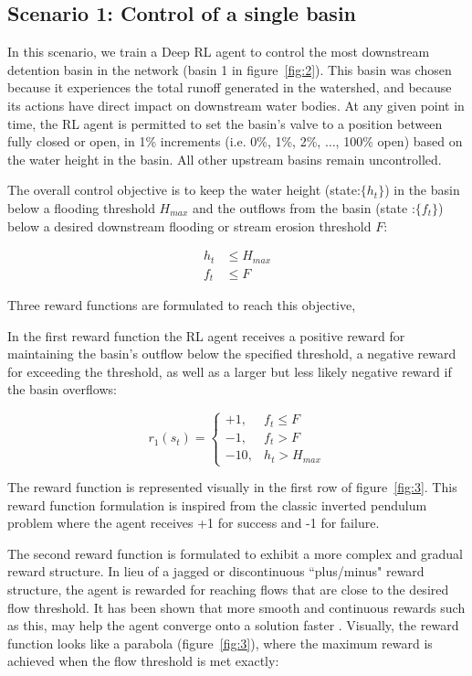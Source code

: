 \subsection{\textbf{Scenario 1: Control of a single basin}}
In this scenario, we train a Deep RL agent to control the most downstream detention basin in the network (basin 1 in figure~\ref{fig:2}).
This basin was chosen because it experiences the total runoff generated in the watershed, and because its actions have direct impact on downstream water bodies.
At any given point in time, the RL agent is permitted to set the basin’s valve to a position between fully closed or open, in 1\% increments (i.e. 0\%, 1\%, 2\%, $\ldots$, 100\% open) based on the water height in the basin. All other upstream basins remain uncontrolled.

The overall control objective is to keep the water height (state:$\{h_t\}$) in the basin below a flooding threshold $H_{max}$ and the outflows from the basin (state :$\{f_t\}$) below a desired downstream flooding or stream erosion threshold $F$:

\begin{align}
    h_t &\leq H_{max} \\
    f_t &\leq F
\end{align}

Three reward functions are formulated to reach this objective, 


In the first reward function the RL agent receives a positive reward for maintaining the basin’s outflow below the specified threshold, a negative reward for exceeding the threshold, as well as a larger but less likely negative reward if the basin overflows:

\begin{equation}
r_1 (s_t )= \begin{cases}
		+1, & f_t \leq F\\
		-1, & f_t > F\\
		-10,& h_t > H_{max}
	\end{cases}
\end{equation}

The reward function is represented visually in the first row of figure~\ref{fig:3}.
This reward function formulation is inspired from the classic inverted pendulum problem \cite{Watkins1992Q-learning} where the agent receives +1 for success and -1 for failure.


The second reward function is formulated to exhibit a more complex and gradual reward structure.
In lieu of a jagged or discontinuous ``plus/minus" reward structure, the agent is rewarded for reaching flows that are close to the desired flow threshold.
It has been shown that more smooth and continuous rewards such as this, may help the agent converge onto a solution faster \cite{Sutton98, aytar2018playing}.
Visually, the reward function looks like a parabola (figure~\ref{fig:3}), where the maximum reward is achieved when the flow threshold is met exactly:


